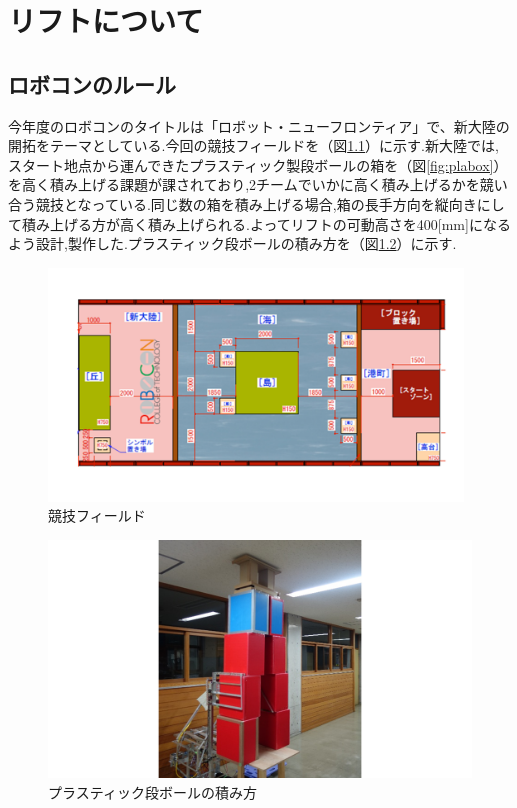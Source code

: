 \chapter{リフトについて}

\section{ロボコンのルール}
今年度のロボコンのタイトルは「ロボット・ニューフロンティア」で、新大陸の開拓をテーマとしている.今回の競技フィールドを（図\ref{fig:field}）に示す.新大陸では,スタート地点から運んできたプラスティック製段ボールの箱を（図\ref{fig:plabox}）を高く積み上げる課題が課されており,2チームでいかに高く積み上げるかを競い合う競技となっている.同じ数の箱を積み上げる場合,箱の長手方向を縦向きにして積み上げる方が高く積み上げられる.よってリフトの可動高さを400[mm]になるよう設計,製作した.プラスティック段ボールの積み方を（図\ref{fig:tumikata}）に示す.


\begin{figure}[htbp]
  \begin{center}
    \includegraphics[width=110mm]{img/field.png}
    \end{center}
  \caption{競技フィールド}
 \label{fig:field}
\end{figure}


\begin{figure}[htbp]
  \begin{center}
    \includegraphics[width=160mm]{img/tumikata.png}
    \end{center}
  \caption{プラスティック段ボールの積み方}
 \label{fig:tumikata}
\end{figure}




